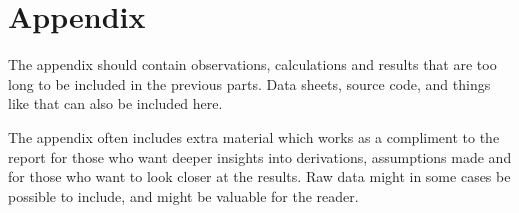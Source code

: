 \chapter{Appendix}
The appendix should contain observations, calculations and results that are too long to be included in the previous parts. Data sheets, source code, and things like that can also be included here. 

The appendix often includes extra material which works as a compliment to the report for those who want deeper insights into derivations, assumptions made and for those who want to look closer at the results. Raw data might in some cases be possible to include, and might be valuable for the reader.

